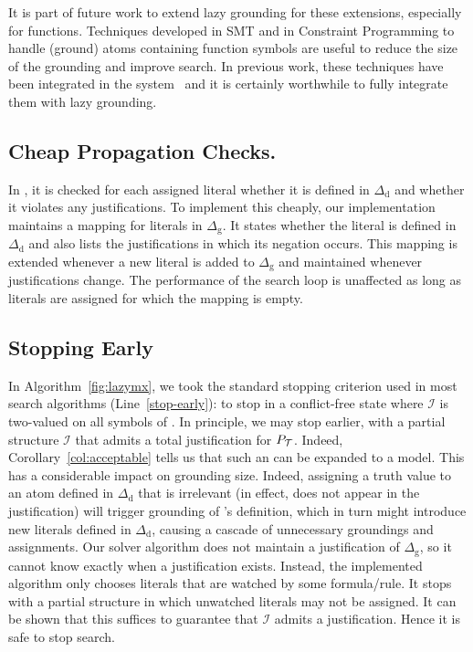 \documentclass[11pt]{article}
\newcommand{\m}[1]{\ensuremath{#1}\xspace}
\newcommand{\I}{\m{\mathcal{I}}}
\newcommand{\theory}{\m{\mathcal{T}}}
\newcommand{\D}{\m{\Delta}}
\newcommand{\logicname}[1]{\text{\sc #1}\xspace}
\newcommand{\idp}{\logicname{IDP}}
\theoremstyle{plain}
\theoremstyle{definition}
\theoremstyle{example_basic}
\theoremstyle{example_contd}
\theoremstyle{plain}
\newcommand{\Dg}{\ensuremath{\D_\text{g}}\xspace}
\newcommand{\Dd}{\ensuremath{\D_\text{d}}\xspace}
\newcommand{\pt}{\ensuremath{P_\text{\theory}}\xspace}
\newcommand{\change}[1]{#1}
\begin{document}
\change{It is part of future work to extend lazy grounding for these
  extensions, especially for functions. Techniques developed in SMT
  and in Constraint Programming to handle (ground) atoms containing
  function symbols are useful to reduce the size of the grounding and
  improve search. In previous work, these techniques have been
  integrated in the \idp system~\cite{ictai/DeCat13} and it is
  certainly worthwhile to fully integrate them with lazy grounding.}

\subsection{Cheap Propagation Checks.} 
In \lazymx, it is checked for each assigned
literal whether it is defined in \Dd and whether it
violates any justifications. To implement this cheaply, 
\change{our implementation maintains a mapping} for literals in \Dg. \change{It states whether
  the literal is defined in \Dd and also lists the justifications in
  which its negation occurs.}
This mapping is extended  whenever a new literal is  added to \Dg and maintained whenever justifications change.  The performance of the search loop is unaffected as long as literals are assigned for which the mapping is empty.

\subsection{Stopping Early} 
\change{In Algorithm~\ref{fig:lazymx}, we took the standard stopping criterion used in most search algorithms (Line~\ref{stop-early}): to stop in a conflict-free state where \I is two-valued on all symbols of .  In principle, we may stop earlier,  with a partial  structure \I that admits a total justification for \pt. Indeed,  Corollary~\ref{col:acceptable}  tells us that such an  can be expanded to a model. This has a considerable impact on grounding size. Indeed, assigning a truth value to an atom  defined in \Dd that is irrelevant (in effect, does not appear in the justification) will trigger grounding of 's definition, which in turn might introduce new literals defined in \Dd, causing a cascade of unnecessary groundings and assignments. Our solver algorithm does not maintain a justification of \Dg, so it cannot know exactly when a justification exists. Instead, the implemented algorithm only chooses literals that are watched by some formula/rule. It stops with a partial structure in which unwatched literals may not be assigned. It can be shown that this suffices to guarantee that \I admits a justification. Hence it is safe to stop search.}
\end{document}
